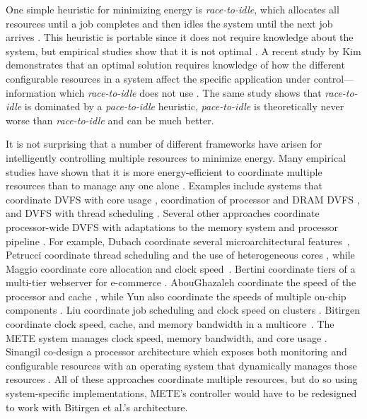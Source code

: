 One simple heuristic for minimizing energy is \emph{race-to-idle}, which allocates all resources until a job completes and then idles the system until the next job arrives \cite{google}.
This heuristic is portable since it does not require knowledge about the system, but empirical studies show that it is not optimal \cite{google,Cheng2009,Yang2007,Yun2010}.
A recent study by Kim \etal demonstrates that an optimal solution requires knowledge of how the different configurable resources in a system affect the specific application under control---information which \emph{race-to-idle} does not use \cite{kim-cpsna2015}.
The same study shows that \emph{race-to-idle} is dominated by a \emph{pace-to-idle} heuristic, \ie \emph{pace-to-idle} is theoretically never worse than \emph{race-to-idle} and can be much better.

It is not surprising that a number of different frameworks have arisen for intelligently controlling multiple resources to minimize energy.
Many empirical studies have shown that it is more energy-efficient to coordinate multiple resources than to manage any one alone \cite{google,Cheng2009,Yang2007,Yun2010}.
Examples include systems that coordinate DVFS with core usage \cite{packandcap-old,TCST,packandcap-new}, coordination of processor and DRAM DVFS \cite{Chen2011,CoScale,Felter2005,Li2007}, and DVFS with thread scheduling \cite{Rangan2009,Winter2010}.
Several other approaches coordinate processor-wide DVFS with adaptations to the memory system and processor pipeline \cite{Bitirgen2008,dubach2010,METE}.
For example, Dubach \etal coordinate several microarchitectural features~\cite{dubach2010},
Petrucci \etal coordinate thread scheduling and the use of heterogeneous cores \cite{Petrucci2012}, while Maggio \etal coordinate core allocation and clock speed~\cite{TCST}.
Bertini \etal coordinate tiers of a multi-tier webserver for e-commerce \cite{Bertini2007}.
AbouGhazaleh \etal coordinate the speed of the processor and cache \cite{AbouGhazaleh2007}, while Yun \etal also coordinate the speeds of multiple on-chip components \cite{Yun2010}.
Liu \etal coordinate job scheduling and clock speed on clusters \cite{Liu2008}.
Bitirgen \etal coordinate clock speed, cache, and memory bandwidth in a multicore~\cite{Bitirgen2008}.
The METE system manages clock speed, memory bandwidth, and core usage \cite{METE}.
Sinangil \etal co-design a processor architecture which exposes both monitoring and configurable resources with an operating system that dynamically manages those resources \cite{sinangil2014self}.
All of these approaches coordinate multiple resources, but do so using system-specific implementations, \eg METE's controller would have to be redesigned to work with Bitirgen et al.'s architecture.

